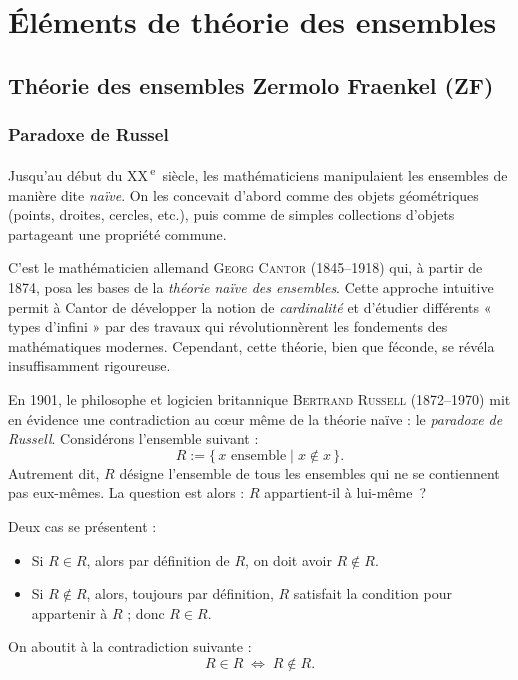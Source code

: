\chapter{Éléments de théorie des ensembles}

\section{Théorie des ensembles Zermolo Fraenkel (ZF)}

\subsection{Paradoxe de Russel}
Jusqu'au début du XX\,\textsuperscript{e}~siècle, les mathématiciens manipulaient les ensembles de manière dite \emph{naïve}.
On les concevait d’abord comme des objets géométriques (points, droites, cercles, etc.), puis comme de simples collections d’objets partageant une propriété commune.

C’est le mathématicien allemand \textsc{Georg Cantor} (1845–1918) qui, à partir de 1874, posa les bases de la \emph{théorie naïve des ensembles}.
Cette approche intuitive permit à Cantor de développer la notion de \emph{cardinalité} et d’étudier différents « types d’infini » par des travaux qui révolutionnèrent les fondements des mathématiques modernes.
Cependant, cette théorie, bien que féconde, se révéla insuffisamment rigoureuse.

\medskip

En 1901, le philosophe et logicien britannique \textsc{Bertrand Russell} (1872–1970) mit en évidence une contradiction au cœur même de la théorie naïve : le \emph{paradoxe de Russell}.
Considérons l’ensemble suivant :
\[
	R := \{\,x \text{ ensemble} \mid x \notin x\,\}.
\]
Autrement dit, $R$ désigne l’ensemble de tous les ensembles qui ne se contiennent pas eux-mêmes.
La question est alors : $R$ appartient-il à lui-même~?

\medskip

\noindent
Deux cas se présentent :
\begin{itemize}
	\item Si $R \in R$, alors par définition de $R$, on doit avoir $R \notin R$.
	\item Si $R \notin R$, alors, toujours par définition, $R$ satisfait la condition pour appartenir à $R$ ; donc $R \in R$.
\end{itemize}
 On aboutit à la contradiction suivante :
\begin{equation*}
	R \in R \;\Longleftrightarrow\; R \notin R.
\end{equation*}

